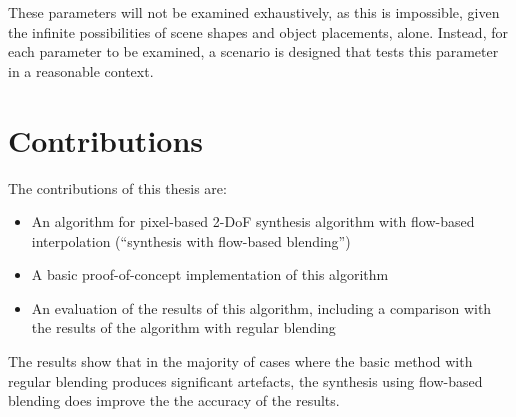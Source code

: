 These parameters will not be examined exhaustively, as this is impossible, given the infinite possibilities of scene shapes and object placements, alone. Instead, for each parameter to be examined, a scenario is designed that tests this parameter in a reasonable context.


%
%
%
%


\section*{Contributions}
The contributions of this thesis are:
\begin{itemize}
  \item An algorithm for pixel-based 2-DoF synthesis algorithm with flow-based interpolation (``synthesis with flow-based blending'')
  \item A basic proof-of-concept implementation of this algorithm
  \item An evaluation of the results of this algorithm, including a comparison with the results of the algorithm with regular blending
\end{itemize}

The results show that in the majority of cases where the basic method with regular blending produces significant artefacts, the synthesis using flow-based blending does improve the the accuracy of the results. 

